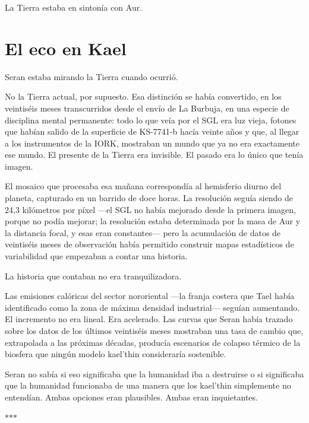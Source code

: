 \documentclass[11pt,a5paper,twoside]{book}
\begin{document}
La Tierra estaba en sintonía con Aur.

\chapter{El eco en Kael}

Seran estaba mirando la Tierra cuando ocurrió.

No la Tierra actual, por supuesto. Esa distinción se había convertido, en los veintiséis meses transcurridos desde el envío de La Burbuja, en una especie de disciplina mental permanente: todo lo que veía por el SGL era luz vieja, fotones que habían salido de la superficie de KS-7741-b hacía veinte años y que, al llegar a los instrumentos de la IORK, mostraban un mundo que ya no era exactamente ese mundo. El presente de la Tierra era invisible. El pasado era lo único que tenía imagen.

El mosaico que procesaba esa mañana correspondía al hemisferio diurno del planeta, capturado en un barrido de doce horas. La resolución seguía siendo de 24,3 kilómetros por píxel —el SGL no había mejorado desde la primera imagen, porque no podía mejorar; la resolución estaba determinada por la masa de Aur y la distancia focal, y esas eran constantes— pero la acumulación de datos de veintiséis meses de observación había permitido construir mapas estadísticos de variabilidad que empezaban a contar una historia.

La historia que contaban no era tranquilizadora.

Las emisiones calóricas del sector nororiental —la franja costera que Tael había identificado como la zona de máxima densidad industrial— seguían aumentando. El incremento no era lineal. Era acelerado. Las curvas que Seran había trazado sobre los datos de los últimos veintiséis meses mostraban una tasa de cambio que, extrapolada a las próximas décadas, producía escenarios de colapso térmico de la biosfera que ningún modelo kael'thin consideraría sostenible.

Seran no sabía si eso significaba que la humanidad iba a destruirse o si significaba que la humanidad funcionaba de una manera que los kael'thin simplemente no entendían. Ambas opciones eran plausibles. Ambas eran inquietantes.

\vspace{1.5em}
\begin{center}$\ast$\quad$\ast$\quad$\ast$\end{center}
\vspace{1.5em}
\end{document}
